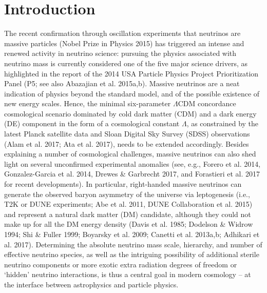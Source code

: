 \documentclass{emulateapj}
\begin{document}





\section{Introduction}


The recent confirmation through oscillation experiments that neutrinos are massive particles (Nobel Prize in Physics 2015) has triggered
an intense and renewed activity in neutrino science:
pursuing the physics associated with neutrino mass is currently considered one of the five major science drivers, as highlighted in the report of the 2014 USA Particle Physics Project Prioritization Panel (P5; see also Abazajian et al. 2015a,b). 
Massive neutrinos are a neat indication of physics beyond the standard model, and of the possible existence of new energy scales.
Hence, the minimal six-parameter  $\Lambda$CDM concordance cosmological scenario dominated by cold dark matter (CDM) and a dark energy (DE) component in the form of a cosmological constant $\Lambda$, 
as constrained by the latest Planck satellite data and Sloan Digital Sky Survey (SDSS) observations (Alam et al. 2017; Ata et al. 2017),
needs to be extended accordingly.  
Besides explaining  a number of cosmological 
challenges, massive neutrinos can also shed light on several unconfirmed experimental anomalies
(see, e.g., Forero et al. 2014, Gonzalez-Garcia et al. 2014,
Drewes \& Garbrecht 2017, and Forastieri et al. 2017 for recent developments). In particular, right-handed massive neutrinos can generate the observed baryon asymmetry of the universe via
leptogenesis (i.e., T2K  or DUNE experiments;  Abe et al. 2011, DUNE Collaboration et al. 2015) and represent a natural dark matter (DM) candidate, although they could 
not make up for all the DM energy density (Davis et al. 1985; Dodelson \& Widrow 1994; Shi \& Fuller 1999; Boyarsky et al. 2009; Canetti et al. 2013a,b; Adhikari et al. 2017).
Determining the absolute neutrino mass scale, hierarchy, and number of effective neutrino species, as well as the intriguing possibility of additional sterile neutrino components or more exotic extra radiation degrees of freedom
or `hidden'  neutrino interactions, is thus a central goal in modern cosmology -- at the interface between astrophysics and particle physics.  
\end{document}
